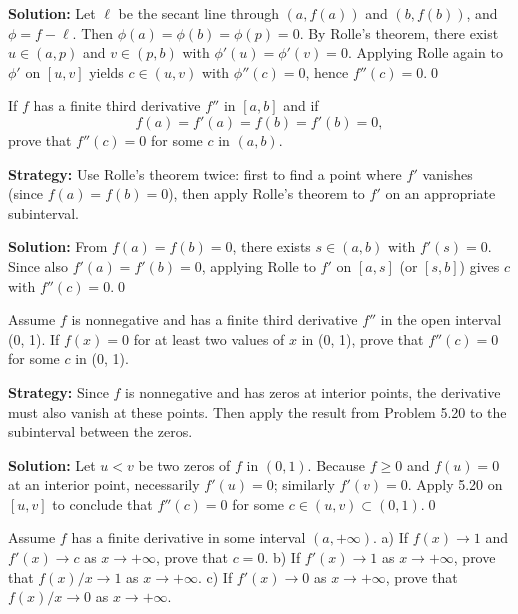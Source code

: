 \bigskip\noindent\textbf{Solution:}
Let $\ell$ be the secant line through $(a,f(a))$ and $(b,f(b))$, and $\phi=f-\ell$. Then $\phi(a)=\phi(b)=\phi(p)=0$. By Rolle's theorem, there exist $u\in(a,p)$ and $v\in(p,b)$ with $\phi'(u)=\phi'(v)=0$. Applying Rolle again to $\phi'$ on $[u,v]$ yields $c\in(u,v)$ with $\phi''(c)=0$, hence $f''(c)=0$.\qed


\begin{problembox}
If \( f \) has a finite third derivative \( f'' \) in \( [a, b] \) and if
\[ f(a) = f'(a) = f(b) = f'(b) = 0, \]
prove that \( f''(c) = 0 \) for some \( c \) in \( (a, b) \).
\end{problembox}

\noindent\textbf{Strategy:} Use Rolle's theorem twice: first to find a point where \( f' \) vanishes (since \( f(a) = f(b) = 0 \)), then apply Rolle's theorem to \( f' \) on an appropriate subinterval.

\bigskip\noindent\textbf{Solution:}
From $f(a)=f(b)=0$, there exists $s\in(a,b)$ with $f'(s)=0$. Since also $f'(a)=f'(b)=0$, applying Rolle to $f'$ on $[a,s]$ (or $[s,b]$) gives $c$ with $f''(c)=0$.\qed


\begin{problembox}
Assume \( f \) is nonnegative and has a finite third derivative \( f'' \) in the open interval (0, 1). If \( f(x) = 0 \) for at least two values of \( x \) in (0, 1), prove that \( f''(c) = 0 \) for some \( c \) in (0, 1).
\end{problembox}

\noindent\textbf{Strategy:} Since \( f \) is nonnegative and has zeros at interior points, the derivative must also vanish at these points. Then apply the result from Problem 5.20 to the subinterval between the zeros.

\bigskip\noindent\textbf{Solution:}
Let $u<v$ be two zeros of $f$ in $(0,1)$. Because $f\ge 0$ and $f(u)=0$ at an interior point, necessarily $f'(u)=0$; similarly $f'(v)=0$. Apply 5.20 on $[u,v]$ to conclude that $f''(c)=0$ for some $c\in(u,v)\subset(0,1)$.\qed


\begin{problembox}
Assume \( f \) has a finite derivative in some interval \( (a, +\infty) \).
a) If \( f(x) \to 1 \) and \( f'(x) \to c \) as \( x \to +\infty \), prove that \( c = 0 \).
b) If \( f'(x) \to 1 \) as \( x \to +\infty \), prove that \( f(x)/x \to 1 \) as \( x \to +\infty \).
c) If \( f'(x) \to 0 \) as \( x \to +\infty \), prove that \( f(x)/x \to 0 \) as \( x \to +\infty \).
\end{problembox}

